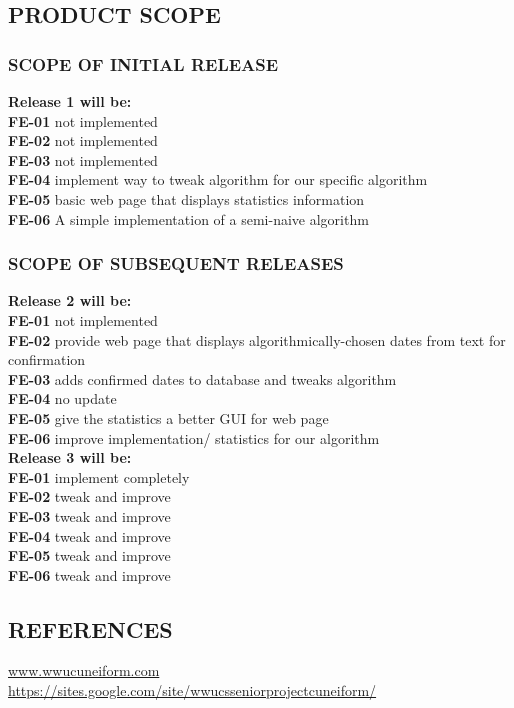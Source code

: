 \documentclass[11pt]{article}
\begin{document}
\subsection{PRODUCT SCOPE}
\subsubsection{SCOPE OF INITIAL RELEASE}
\textbf{Release 1 will be:}\\
\textbf{FE-01} not implemented\\
\textbf{FE-02} not implemented\\
\textbf{FE-03} not implemented\\
\textbf{FE-04} implement way to tweak algorithm for our specific algorithm\\
\textbf{FE-05} basic web page that displays statistics information\\
\textbf{FE-06} A simple implementation of a semi-naive algorithm

\subsubsection{SCOPE OF SUBSEQUENT RELEASES}
\textbf{Release 2 will be:}\\
\textbf{FE-01} not implemented\\
\textbf{FE-02} provide web page that displays algorithmically-chosen dates from text for confirmation\\
\textbf{FE-03} adds confirmed dates to database and tweaks algorithm\\
\textbf{FE-04} no update\\
\textbf{FE-05} give the statistics a better GUI for web page\\
\textbf{FE-06} improve implementation/ statistics for our algorithm\\

\textbf{Release 3 will be:}\\
\textbf{FE-01} implement completely\\
\textbf{FE-02} tweak and improve\\
\textbf{FE-03 }tweak and improve\\
\textbf{FE-04} tweak and improve\\
\textbf{FE-05}  tweak and improve\\
\textbf{FE-06}  tweak and improve

\subsection{REFERENCES}
\url{www.wwucuneiform.com}\\
\url{https://sites.google.com/site/wwucsseniorprojectcuneiform/}
\end{document}
